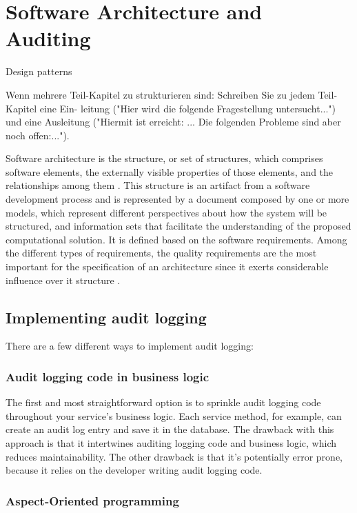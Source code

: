 %
\chapter{Software Architecture and Auditing}
Design patterns

Wenn mehrere Teil-Kapitel zu strukturieren sind: Schreiben Sie zu jedem Teil-Kapitel eine Ein- leitung ("Hier wird die folgende Fragestellung untersucht...") und eine Ausleitung ("Hiermit ist erreicht: ... Die folgenden Probleme sind aber noch offen:...").

Software architecture is the structure, or set of structures, which comprises
software elements, the externally visible properties of those elements, and the
relationships among them \citep{SAIP}. This structure is an artifact from a software
development process and is represented by a document composed by one or more
models, which represent different perspectives about how the system will be
structured, and information sets that facilitate the understanding of the proposed
computational solution. It is defined based on the software requirements. Among the
different types of requirements, the quality requirements are the most important for
the specification of an architecture since it exerts considerable influence over it
structure \citep{SAIP}.

\section{Implementing audit logging}

There are a few different ways to implement audit logging:~\citep{richardson2018microservices}

\subsection{Audit logging code in business logic}

The first and most straightforward option is to sprinkle audit logging code throughout your service’s business logic. Each service method, for example, can create an
audit log entry and save it in the database. The drawback with this approach is that it
intertwines auditing logging code and business logic, which reduces maintainability.
The other drawback is that it’s potentially error prone, because it relies on the developer writing audit logging code.

\subsection{Aspect-Oriented programming}

